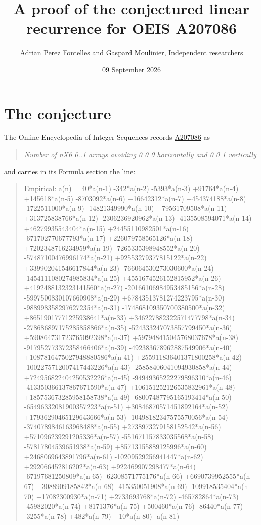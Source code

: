 \documentclass[11pt]{article}
\title{A proof of the conjectured linear recurrence for OEIS A207086}
\author{Adrian Perez Fontelles and Gaspard Moulinier, Independent researchers}
\date{09 September 2026}
\theoremstyle{definition}
\begin{document}
\maketitle
\section{The conjecture}

The Online Encyclopedia of Integer Sequences records \href{https://oeis.org/A207086}{A207086} as

\begin{quote}\itshape Number of nX6 0..1 arrays avoiding 0 0 0 horizontally and 0 0 1 vertically\end{quote}

and carries in its Formula section the line:

\begin{quote}\ttfamily Empirical: a(n) = 40*a(n-1) -342*a(n-2) -5393*a(n-3) +91764*a(n-4) +145618*a(n-5) -8703092*a(n-6) +16642312*a(n-7) +454374188*a(n-8) -1722511000*a(n-9) -14821349990*a(n-10) +79561709508*a(n-11) +313725838766*a(n-12) -2306236920962*a(n-13) -4135508594071*a(n-14) +46279935543404*a(n-15) +24455110982501*a(n-16) -671702770677793*a(n-17) +226079758565126*a(n-18) +7202348716234959*a(n-19) -7265335398948552*a(n-20) -57487100476996174*a(n-21) +92553279377815122*a(n-22) +339902041546617844*a(n-23) -766064530273030600*a(n-24) -1454111080274985834*a(n-25) +4551674526152815952*a(n-26) +4192488132323141560*a(n-27) -20166106984953485156*a(n-28) -5997500830107660908*a(n-29) +67843513781274223795*a(n-30) -9889983582976272354*a(n-31) -174868109350700380500*a(n-32) +86519017771225938641*a(n-33) +346227882322571477798*a(n-34) -278686897175285858866*a(n-35) -524333247073857799450*a(n-36) +590864731723765092398*a(n-37) +597948415045768037678*a(n-38) -917952773372358466406*a(n-39) -492383678962887549906*a(n-40) +1087816475027948880586*a(n-41) +255911836401371800258*a(n-42) -1002275712007417443226*a(n-43) -25858406041094930858*a(n-44) +724956822404250532226*a(n-45) -94949365222279896310*a(n-46) -413350366137867671590*a(n-47) +106151252126535832961*a(n-48) +185753673285958158738*a(n-49) -68007487795165193414*a(n-50) -65496332081900357223*a(n-51) +30846870571451892164*a(n-52) +17936290465129643666*a(n-53) -10498182347575570056*a(n-54) -3740789846163968488*a(n-55) +2738973279158152542*a(n-56) +571096239291205336*a(n-57) -551671157833035568*a(n-58) -57817804539651938*a(n-59) +85713155889125996*a(n-60) +2468069643891796*a(n-61) -10209529256941447*a(n-62) +292066452816202*a(n-63) +922469907298477*a(n-64) -67197681250809*a(n-65) -62308571775176*a(n-66) +6690739952555*a(n-67) +3088909185842*a(n-68) -415350051908*a(n-69) -109918535404*a(n-70) +17082300930*a(n-71) +2733693768*a(n-72) -465782864*a(n-73) -45982020*a(n-74) +8171376*a(n-75) +500460*a(n-76) -86440*a(n-77) -3255*a(n-78) +482*a(n-79) +10*a(n-80) -a(n-81)\end{quote}
\end{document}
